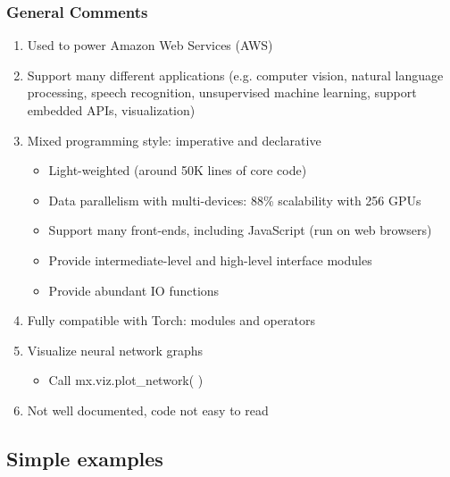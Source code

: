 \begin{frame}
  \MyLogo
  \frametitle{General Comments}  

\begin{enumerate}
%
\item Used to power Amazon Web Services (AWS)
%
\item Support many different applications (e.g. computer vision, natural language processing,  speech recognition, unsupervised machine learning, support embedded APIs, visualization)
%
\item Mixed programming style: imperative and declarative
\begin{itemize}
\item Light-weighted (around 50K lines of core code)
\item Data parallelism with multi-devices: 88\% scalability with 256 GPUs
\item Support many front-ends, including JavaScript (run on web browsers)
\item Provide intermediate-level and high-level interface modules
\item Provide abundant IO functions 
%
\end{itemize}
%
\item Fully compatible with Torch: modules and operators
%
\item Visualize neural network graphs
\begin{itemize}
\item Call mx.viz.plot\_network( )
\end{itemize}
%
\item Not well documented, code not easy to read
%
\end{enumerate}

\end{frame}

\subsection{Simple examples}

